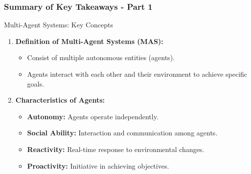 \documentclass[aspectratio=169]{beamer}
\begin{document}
\begin{frame}[fragile]
    \frametitle{Summary of Key Takeaways - Part 1}
    \begin{block}{Multi-Agent Systems: Key Concepts}
        \begin{enumerate}
            \item \textbf{Definition of Multi-Agent Systems (MAS):}
                \begin{itemize}
                    \item Consist of multiple autonomous entities (agents).
                    \item Agents interact with each other and their environment to achieve specific goals.
                \end{itemize}
            \item \textbf{Characteristics of Agents:}
                \begin{itemize}
                    \item \textbf{Autonomy:} Agents operate independently.
                    \item \textbf{Social Ability:} Interaction and communication among agents.
                    \item \textbf{Reactivity:} Real-time response to environmental changes.
                    \item \textbf{Proactivity:} Initiative in achieving objectives.
                \end{itemize}
        \end{enumerate}
    \end{block}
\end{frame}
\end{document}
